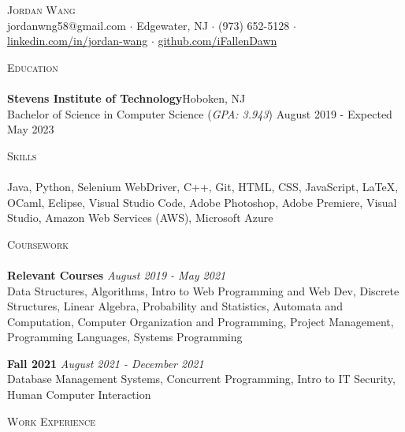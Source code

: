 \documentclass[10pt]{article}
\newcommand{\lineunder} {
    \vspace*{-8pt} \\
    \hspace*{-18pt} \hrulefill \\
}
\newcommand{\header} [1] {
    {\hspace*{-18pt}\vspace*{6pt} \textsc{#1}}
    \vspace*{-6pt} \lineunder
}
\begin{document}
\vspace*{-40pt}

    

\vspace*{2pt}
\begin{center}
	{\Huge \scshape {Jordan Wang}}\\
	\vspace{2mm}
	jordanwng58@gmail.com $\cdot$ Edgewater, NJ $\cdot$ (973) 652-5128 $\cdot$ \href{https://www.linkedin.com/in/jordan-wang/}{linkedin.com/in/jordan-wang} $\cdot$ \href{https://github.com/iFallenDawn}{github.com/iFallenDawn} \\
\end{center}
\header{Education}
\textbf{Stevens Institute of Technology}\hfill Hoboken, NJ\\
Bachelor of Science in Computer Science (\textit{GPA: 3.943}) \hfill August 2019 - Expected May 2023\\
\vspace{2mm}

\header{Skills}
	Java, Python, Selenium WebDriver, C++, Git, HTML, CSS, JavaScript, \LaTeX, OCaml, Eclipse, Visual Studio Code, Adobe Photoshop, Adobe Premiere, Visual Studio, Amazon Web Services (AWS), Microsoft Azure                    \\
\vspace{2mm}

\header{Coursework}
{\textbf{Relevant Courses}} {\sl August 2019 - May 2021} \hfill 
\\
Data Structures, Algorithms, Intro to Web Programming and Web Dev, Discrete Structures, Linear Algebra, Probability and Statistics, Automata and Computation, Computer Organization and Programming,  Project Management, Programming Languages, Systems Programming\\
\vspace*{2mm}

{\textbf{Fall 2021}} {\sl August 2021 - December 2021} \hfill 
\\
Database Management Systems, Concurrent Programming, Intro to IT Security, Human Computer Interaction\\
\vspace*{2mm}

\header{Work Experience}
\vspace{1mm}
\end{document}
